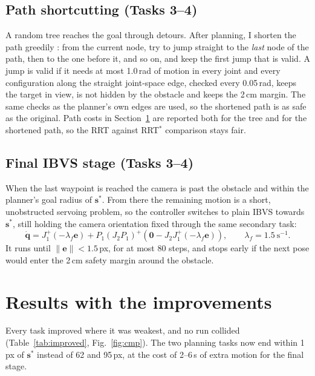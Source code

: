 \documentclass[11pt,a4paper]{article}
\newcommand{\vect}[1]{\bm{#1}}
\newcommand{\pinv}{^{+}}
\begin{document}
\subsection{Path shortcutting (Tasks 3--4)}

A random tree reaches the goal through detours. After planning, I shorten the path greedily
\cite{geraerts2007}: from the current node, try to jump straight to the \emph{last} node of the path,
then to the one before it, and so on, and keep the first jump that is valid. A jump is valid if it
needs at most 1.0\,rad of motion in every joint and every configuration along the straight joint-space
edge, checked every 0.05\,rad, keeps the target in view, is not hidden by the obstacle and keeps the
2\,cm margin. The same checks as the planner's own edges are used, so the shortened path is as safe as
the original. Path costs in Section~\ref{sec:improved} are reported both for the tree and for the
shortened path, so the RRT against RRT$^{*}$ comparison stays fair.

\subsection{Final IBVS stage (Tasks 3--4)}

When the last waypoint is reached the camera is past the obstacle and within the planner's goal radius
of $\vect s^{*}$. From there the remaining motion is a short, unobstructed servoing problem, so the
controller switches to plain IBVS towards $\vect s^{*}$, still holding the camera orientation fixed
through the same secondary task:
\begin{equation}
  \dot{\vect q}=J_1\pinv(-\lambda_f\vect e)+P_1(J_2P_1)\pinv\!\left(\vect 0-J_2J_1\pinv(-\lambda_f\vect e)\right),\qquad \lambda_f=1.5\ \text{s}^{-1}.
\end{equation}
It runs until $\lVert\vect e\rVert<1.5$\,px, for at most 80 steps, and stops early if the next pose would
enter the 2\,cm safety margin around the obstacle.

\section{Results with the improvements}\label{sec:improved}

Every task improved where it was weakest, and no run collided (Table~\ref{tab:improved},
Fig.~\ref{fig:cmp}). The two planning tasks now end within 1\,px of $\vect s^{*}$ instead of 62 and
95\,px, at the cost of 2--6\,s of extra motion for the final stage.
\end{document}
